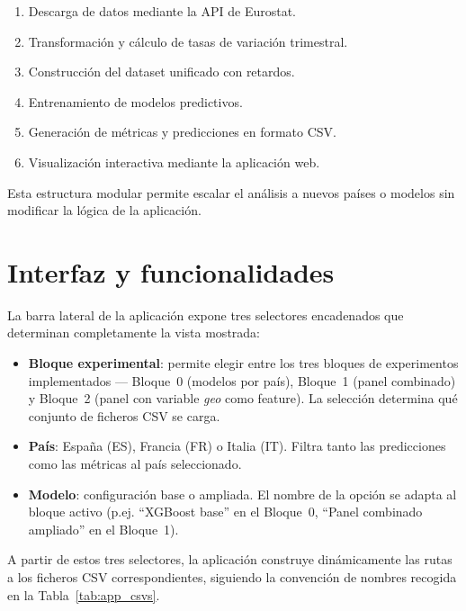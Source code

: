 \begin{enumerate}
    \item Descarga de datos mediante la API de Eurostat.
    \item Transformación y cálculo de tasas de variación trimestral.
    \item Construcción del dataset unificado con retardos.
    \item Entrenamiento de modelos predictivos.
    \item Generación de métricas y predicciones en formato CSV.
    \item Visualización interactiva mediante la aplicación web.
\end{enumerate}

Esta estructura modular permite escalar el análisis a nuevos países o modelos sin modificar la lógica de la aplicación.

\section{Interfaz y funcionalidades}

La barra lateral de la aplicación expone tres selectores encadenados que determinan
completamente la vista mostrada:

\begin{itemize}
    \item \textbf{Bloque experimental}: permite elegir entre los tres bloques de
          experimentos implementados --- Bloque~0 (modelos por país), Bloque~1 (panel
          combinado) y Bloque~2 (panel con variable \emph{geo} como feature). La selección
          determina qué conjunto de ficheros CSV se carga.
    \item \textbf{País}: España (ES), Francia (FR) o Italia (IT). Filtra tanto las
          predicciones como las métricas al país seleccionado.
    \item \textbf{Modelo}: configuración base o ampliada. El nombre de la opción se
          adapta al bloque activo (p.ej. ``XGBoost base'' en el Bloque~0,
          ``Panel combinado ampliado'' en el Bloque~1).
\end{itemize}

A partir de estos tres selectores, la aplicación construye dinámicamente las rutas a los
ficheros CSV correspondientes, siguiendo la convención de nombres recogida en la
Tabla~\ref{tab:app_csvs}.

